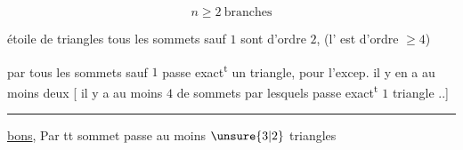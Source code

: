\[ n\geq 2\ \text{branches} \]

 étoile de triangles   tous les sommets sauf $1$ sont d'ordre $2$,  (l' est d'ordre $\geq4$)

par tous les sommets sauf $1$ passe exact\textsuperscript{t} un triangle, pour l'excep. il y en a  au moins deux [  il y a au moins $4$ de sommets par lesquels passe  exact\textsuperscript{t} $1$ triangle ..]

\noindent\rule{\linewidth}{.4pt}

\uline{bons}, Par tt sommet passe au moins $\unsure{3|2}$ triangles

